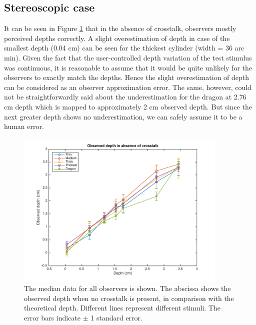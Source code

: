 \subsection{Stereoscopic case}
It can be seen in Figure \ref{fig:s_crosstalk_0} that in the absence of crosstalk, observers mostly perceived depths correctly. A slight overestimation of depth in case of the smallest depth (0.04 cm) can be seen for the thickest cylinder (width = 36 arc min). Given the fact that the user-controlled depth variation of the test stimulus was continuous, it is reasonable to assume that it would be quite unlikely for the observers to exactly match the depths. Hence the slight overestimation of depth can be considered as an observer approximation error. The same, however, could not be straightforwardly said about the underestimation for the dragon at 2.76 cm depth which is mapped to approximately 2 cm observed depth. But since the next greater depth shows no underestimation, we can safely assume it to be a human error.
\begin{figure}[H]
\centering
    \includegraphics[width=0.9\textwidth]{./Template_Figures/s_crosstalk_0}
    \caption{The median data for all observers is shown. The abscissa shows the observed depth when no crosstalk is present, in comparison with the theoretical depth. Different lines represent different stimuli. The error bars indicate $\pm$ 1 standard error.\label{fig:s_crosstalk_0}}
\end{figure}

